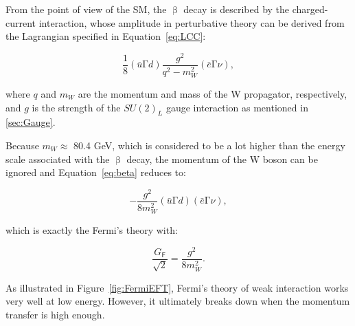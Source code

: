 From the point of view of the \ac{SM}, the $\upbeta$ decay is described by the charged-current interaction, whose amplitude in perturbative theory can be derived from the Lagrangian specified in Equation~\ref{eq:LCC}:

\begin{equation}
\label{eq:beta}
\frac{1}{8}(\bar{u}\mathrm{\Gamma}d)\frac{g^2}{q^2-m_{W}^2}(\bar{e}\mathrm{\Gamma}\nu),
\end{equation}

where $q$ and $m_W$ are the momentum and mass of the W propagator, respectively, and $g$ is the strength of the $SU(2)_{L}$ gauge interaction as mentioned in \autoref{sec:Gauge}.

Because $m_W\approx$ 80.4 GeV, which is considered to be a lot higher than the energy scale associated with the $\upbeta$ decay, the momentum of the W boson can be ignored and Equation~\ref{eq:beta} reduces to:

\begin{equation}
\label{eq:beta2}
-\frac{g^2}{8m_{W}^2}(\bar{u}\mathrm{\Gamma}d)(\bar{e}\mathrm{\Gamma}\nu),
\end{equation}

which is exactly the Fermi's theory with:

\begin{equation}
\frac{G_{\textsf{F}}}{\sqrt{2}}=\frac{g^2}{8m_{W}^2}.
\end{equation}

As illustrated in Figure~\ref{fig:FermiEFT}, Fermi's theory of weak interaction works very well at low energy. However, it ultimately breaks down when the momentum transfer is high enough. 

